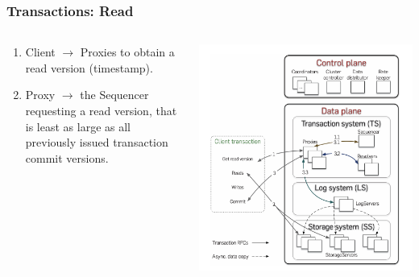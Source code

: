\begin{frame}
    \frametitle{Transactions: Read}
    \begin{columns}
        \begin{column}{0.5\textwidth}
            \begin{enumerate}
    \item Client $\rightarrow$ Proxies to obtain a read version (timestamp).
    \item Proxy $\rightarrow$ the Sequencer requesting a read version, that is  least as large as all previously issued transaction commit versions.
            \end{enumerate}
        \end{column}
        \begin{column}{0.5\textwidth}
            \centering
            \includegraphics[width=\textwidth]{img/2-Architecture/Architecture and transaction processing.png}
        \end{column}
    \end{columns}
\end{frame}


